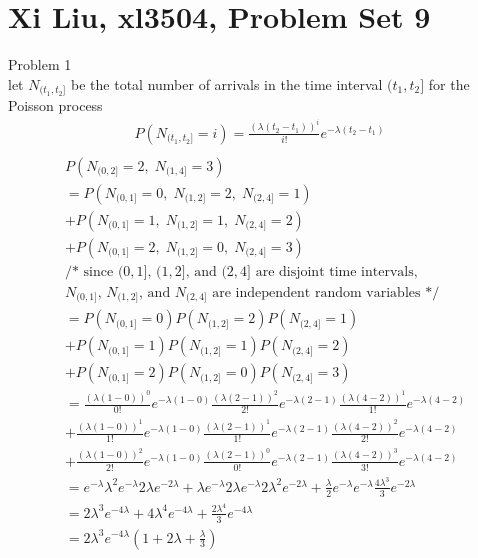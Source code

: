 \documentclass[12pt,border=4pt,multi]{article} %
\begin{document}
\section*{Xi Liu, xl3504, Problem Set 9}
Problem 1\\
let $N_{(t_1, t_2]}$ be the total number of arrivals in the time interval $(t_1, t_2]$ for the Poisson process
\begin{align*}
P(N_{(t_1, t_2]} = i) = \frac{(\lambda (t_2 - t_1))^i}{i!} e^{-\lambda (t_2 - t_1)}\\
\end{align*}
\begin{align*}
&P(N_{(0, 2]} = 2,\; N_{(1, 4]} = 3)\\ 
&= P(N_{(0, 1]} = 0,\; N_{(1, 2]} = 2,\; N_{(2, 4]} = 1)\\
&+ P(N_{(0, 1]} = 1,\; N_{(1, 2]} = 1,\; N_{(2, 4]} = 2)\\
&+ P(N_{(0, 1]} = 2,\; N_{(1, 2]} = 0,\; N_{(2, 4]} = 3)\\
&\text{/* since $(0, 1]$, $(1, 2]$, and $(2, 4]$ are disjoint time intervals,}\\
&\text{$N_{(0, 1]}$, $N_{(1, 2]}$, and $N_{(2, 4]}$ are independent random variables */}\\
&= P(N_{(0, 1]} = 0)P(N_{(1, 2]} = 2)P(N_{(2, 4]} = 1)\\
&+ P(N_{(0, 1]} = 1)P(N_{(1, 2]} = 1)P(N_{(2, 4]} = 2)\\
&+ P(N_{(0, 1]} = 2)P(N_{(1, 2]} = 0)P(N_{(2, 4]} = 3)\\
&= \frac{(\lambda (1 - 0))^0}{0!} e^{-\lambda (1 - 0)}\frac{(\lambda (2 - 1))^2}{2!} e^{-\lambda (2 - 1)}\frac{(\lambda (4 - 2))^1}{1!} e^{-\lambda (4 - 2)}\\
&+ \frac{(\lambda (1 - 0))^1}{1!} e^{-\lambda (1 - 0)}\frac{(\lambda (2 - 1))^1}{1!} e^{-\lambda (2 - 1)}\frac{(\lambda (4 - 2))^2}{2!} e^{-\lambda (4 - 2)}\\
&+ \frac{(\lambda (1 - 0))^2}{2!} e^{-\lambda (1 - 0)}\frac{(\lambda (2 - 1))^0}{0!} e^{-\lambda (2 - 1)}\frac{(\lambda (4 - 2))^3}{3!} e^{-\lambda (4 - 2)}\\
&= e^{-\lambda}\lambda^2 e^{-\lambda}2\lambda e^{-2\lambda} + \lambda e^{-\lambda}2\lambda e^{-\lambda}2\lambda^2 e^{-2\lambda} + \frac{\lambda}{2} e^{-\lambda} e^{-\lambda}\frac{4\lambda^3}{3} e^{-2\lambda}\\
&= 2\lambda^3 e^{-4\lambda} + 4\lambda^4 e^{-4\lambda} + \frac{2\lambda^4}{3}e^{-4\lambda}\\
&= \boxed{2\lambda^3 e^{-4\lambda}\left(1 + 2\lambda + \frac{\lambda}{3}\right)}\\
\end{align*}
\end{document}
